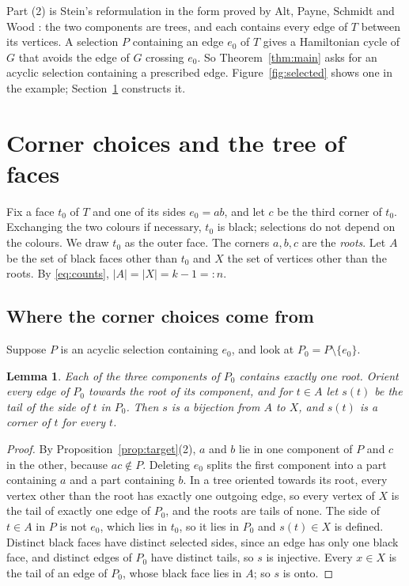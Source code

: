 \documentclass[10pt]{amsart}
\numberwithin{equation}{section}
\newtheorem{lemma}[equation]{Lemma}
\theoremstyle{definition}
\theoremstyle{remark}
\newcommand{\T}{T}
\begin{document}
Part (2) is Stein's reformulation \cite{stein1971} in the form proved by Alt, Payne, Schmidt and Wood \cite[Lemma~5]{apsw2016}: the two components are trees, and each contains every edge of $\T$ between its vertices.
A selection $P$ containing an edge $e_0$ of $\T$ gives a Hamiltonian cycle of $G$ that avoids the edge of $G$ crossing $e_0$.
So Theorem~\ref{thm:main} asks for an acyclic selection containing a prescribed edge.
Figure~\ref{fig:selected} shows one in the example; Section~\ref{sec:corners} constructs it.

\section{Corner choices and the tree of faces}\label{sec:corners}

Fix a face $t_0$ of $\T$ and one of its sides $e_0=ab$, and let $c$ be the third corner of $t_0$.
Exchanging the two colours if necessary, $t_0$ is black; selections do not depend on the colours.
We draw $t_0$ as the outer face.
The corners $a,b,c$ are the \emph{roots}.
Let $A$ be the set of black faces other than $t_0$ and $X$ the set of vertices other than the roots.
By \eqref{eq:counts}, $|A|=|X|=k-1=:n$.

\subsection*{Where the corner choices come from}
Suppose $P$ is an acyclic selection containing $e_0$, and look at $P_0=P\setminus\{e_0\}$.

\begin{lemma}\label{lem:selections-give-states}
Each of the three components of $P_0$ contains exactly one root.
Orient every edge of $P_0$ towards the root of its component, and for $t\in A$ let $s(t)$ be the tail of the side of $t$ in $P_0$.
Then $s$ is a bijection from $A$ to $X$, and $s(t)$ is a corner of $t$ for every $t$.
\end{lemma}

\begin{proof}
By Proposition~\ref{prop:target}(2), $a$ and $b$ lie in one component of $P$ and $c$ in the other, because $ac\notin P$.
Deleting $e_0$ splits the first component into a part containing $a$ and a part containing $b$.
In a tree oriented towards its root, every vertex other than the root has exactly one outgoing edge, so every vertex of $X$ is the tail of exactly one edge of $P_0$, and the roots are tails of none.
The side of $t\in A$ in $P$ is not $e_0$, which lies in $t_0$, so it lies in $P_0$ and $s(t)\in X$ is defined.
Distinct black faces have distinct selected sides, since an edge has only one black face, and distinct edges of $P_0$ have distinct tails, so $s$ is injective.
Every $x\in X$ is the tail of an edge of $P_0$, whose black face lies in $A$; so $s$ is onto.
\end{proof}
\end{document}
